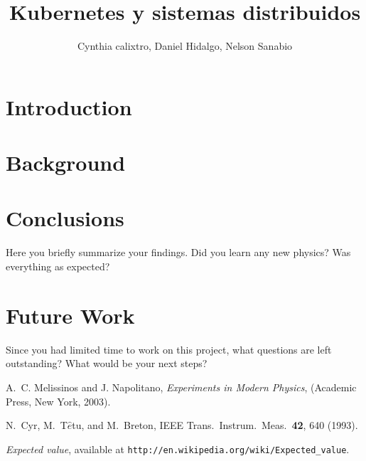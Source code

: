 \documentclass[letterpaper,12pt]{article}
\begin{document}
\title{Kubernetes y sistemas distribuidos}
\author{Cynthia calixtro, Daniel Hidalgo, Nelson Sanabio}
\date{}
\maketitle
\section{Introduction}

\section{Background}


\section{Conclusions}
Here you briefly summarize your findings. Did you learn any new physics? Was everything as expected?

\section{Future Work}
Since you had limited time to work on this project, what questions are left outstanding? What would be your next steps? 


\begin{thebibliography}{99}

A.~C. Melissinos and J. Napolitano, \textit{Experiments in Modern Physics},
(Academic Press, New York, 2003).

N.\ Cyr, M.\ T$\hat{e}$tu, and M.\ Breton,
IEEE Trans.\ Instrum.\ Meas.\ \textbf{42}, 640 (1993).

 \emph{Expected value},  available at
\texttt{http://en.wikipedia.org/wiki/Expected\_value}.

\end{thebibliography}
\end{document}
